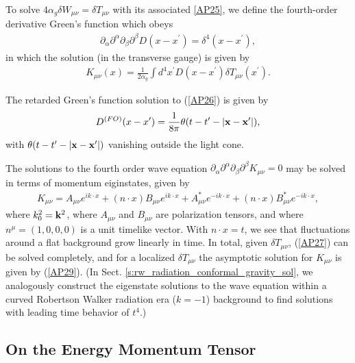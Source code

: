 To solve $4\alpha_g \delta W_{\mu\nu} = \delta T_{\mu\nu}$ with its associated \eqref{AP25}, we define the fourth-order derivative Green's function which obeys
%
\begin{eqnarray}
\partial_{\alpha}\partial^{\alpha} \partial_{\beta}\partial^{\beta}D(x-x^{\prime})=\delta^4(x-x^{\prime}),
\label{AP26}
\end{eqnarray}
%
in which the solution (in the transverse gauge) is given by 
%
\begin{eqnarray}
K_{\mu\nu}(x)=\frac{1}{2\alpha_g}\int d^4x^{\prime}D(x-x^{\prime})\delta T_{\mu\nu}(x^{\prime}).
\label{AP27}
\end{eqnarray}
%

The retarded Green's function  solution to (\ref{AP26}) \cite{mannheim_2007} is given by
%
\begin{eqnarray}
D^{(FO)}(x-x^{\prime})=\frac{1}{8\pi}\theta (t-t^{\prime}-|{\bf x}-{\bf x}^{\prime}|),
\label{AP28}
\end{eqnarray}
%
with $\theta (t-t^{\prime}-|{\bf x}-{\bf x}^{\prime}|)$ vanishing outside the light cone. 

The solutions to the fourth order wave equation $\partial_{\alpha}\partial^{\alpha} \partial_{\beta}\partial^{\beta}K_{\mu \nu}=0$ may be solved in terms of momentum eiginstates, given by \cite{riegert_1984a,mannheim_2012}
%
\begin{eqnarray}
K_{\mu\nu}=A_{\mu\nu}e^{ik\cdot x}+(n\cdot x)B_{\mu\nu}e^{ik\cdot x}+A^*_{\mu\nu}e^{-ik\cdot x}+(n\cdot x)B^*_{\mu\nu}e^{-ik\cdot x},
\label{AP29}
\end{eqnarray}
%
where $k_0^2={\bf k}^2$, where $A_{\mu\nu}$ and $B_{\mu\nu}$ are polarization tensors, and where $n^{\mu}=(1,0,0,0)$ is a unit timelike vector.  With $n\cdot x=t$, we see that fluctuations around a flat background grow linearly in time. In total, given $\delta T_{\mu\nu}$, (\ref{AP27}) can be solved completely, and for a localized $\delta T_{\mu\nu}$ the asymptotic solution for $K_{\mu\nu}$ is given by (\ref{AP29}). (In Sect. \ref{s:rw_radiation_conformal_gravity_sol}, we analogously construct the eigenstate solutions to the wave equation within a curved Robertson Walker radiation era ($k=-1$) background to find solutions with leading time behavior of $t^4$.) 
%
\subsection{On the Energy Momentum Tensor}
\label{ss:on_the_energy_momentum_tensor}

